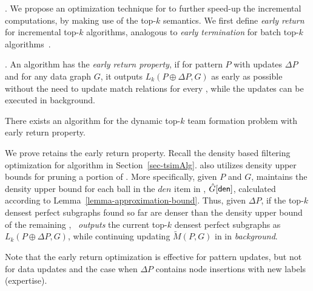 
.
We propose an optimization technique for \incp to further speed-up the incremental computations, by making use of the top-$k$ semantics.
%
We first define {\em early return} for incremental top-$k$ algorithms, analogous to {\em early termination} for batch top-$k$ algorithms~\cite{FaginLotem03}.


. An algorithm has the {\em early return property},
if for pattern $P$ with updates $\Delta P$ and for any data graph $G$,
it outputs $L_k(P\oplus \Delta P, G)$ as early as possible without the need to update match relations for every \affballx,
while the updates can be executed in background.


\begin{prop}
\label{prop-early-return}
There exists an algorithm for the dynamic top-$k$ team formation problem with early return property.
\end{prop}


We prove \incp retains the early return property.
Recall the density based filtering optimization for algorithm \optgrouprec in Section~\ref{sec-tsimAlg}.
\incp also utilizes density upper bounds for pruning a portion of \affballsx.
More specifically, given $P$ and $G$, \incp maintains the density upper bound for each ball in the $den$ item in \bs, \ie $\hat{G}{}[{\mathsf{den}}]$,
calculated according to Lemma~\ref{lemma-approximation-bound}.
Thus, given $\Delta P$, if the top-$k$ densest perfect subgraphs found so far are denser than the density upper bound of the remaining \affballsx,
\incp\ {\em outputs} the current top-$k$ densest perfect subgraphs as $L_k(P\oplus \Delta P, G)$,
while continuing updating $\tilde{M}(P, G)$ in \affballsx in {\em background}.

Note that the early return optimization is  effective for pattern updates, but not for data updates and the case when $\Delta P$ contains node insertions with new labels (expertise).

